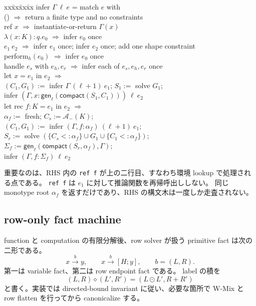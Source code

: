 \documentclass[uplatex,dvipdfmx,a4paper,10.5pt]{jsarticle}
\theoremstyle{jpplain}
\newcommand{\gen}{\mathsf{gen}}
\newcommand{\compact}{\mathsf{compact}}
\newcommand{\edge}[3]{#1\xrightarrow{#2}#3}
\newcommand{\epedge}[4]{#1\xrightarrow{#2}[#3;#4]}
\begin{document}
\begin{formalbox}[title={推論関数の制御構造}]
\begingroup\small\ttfamily
\begin{tabbing}
xx\=xx\=xx\=xx\kill
infer $\Gamma\ \ell\ e$ = match $e$ with\\
\> () $\Rightarrow$ return a finite type and no constraints\\
\> ref $x$ $\Rightarrow$ instantiate-or-return $\Gamma(x)$\\
\> $\lambda(x:K):q.e_0$ $\Rightarrow$ infer $e_0$ once\\
\> $e_1\ e_2$ $\Rightarrow$ infer $e_1$ once; infer $e_2$ once; add one shape constraint\\
\> perform$_h(e_0)$ $\Rightarrow$ infer $e_0$ once\\
\> handle $e_s$ with $e_h,e_r$ $\Rightarrow$ infer each of $e_s,e_h,e_r$ once\\
\> let $x=e_1$ in $e_2$ $\Rightarrow$\\
\>\> $(C_1,G_1):=$ infer $\Gamma\ (\ell+1)\ e_1$; $S_1:=$ solve $G_1$;\\
\>\> infer $(\Gamma,x:\gen_\ell(\compact(S_1,C_1)))\ \ell\ e_2$\\
\> let rec $f:K=e_1$ in $e_2$ $\Rightarrow$\\
\>\> $\alpha_f:=$ fresh; $C_s:=\mathcal A_-(K)$;\\
\>\> $(C_1,G_1):=$ infer $(\Gamma,f:\alpha_f)\ (\ell+1)\ e_1$;\\
\>\> $S_r:=$ solve $(\{C_s<:\alpha_f\}\cup G_1\cup\{C_1<:\alpha_f\})$;\\
\>\> $\Sigma_f:=\gen_\ell(\compact(S_r,\alpha_f),\Gamma)$;\\
\>\> infer $(\Gamma,f:\Sigma_f)\ \ell\ e_2$
\end{tabbing}
\endgroup
\end{formalbox}

重要なのは、RHS 内の \texttt{ref f} が上の二行目、すなわち環境 lookup で処理される点である。
\texttt{ref f} は $e_1$ に対して推論関数を再帰呼出ししない。
同じ monotype root $\alpha_f$ を返すだけであり、RHS の構文木は一度しか走査されない。

\subsection{row-only fact machine}

function と computation の有限分解後、row solver が扱う primitive fact は次の二形である。
\[
  \edge{x}{b}{y},
  \qquad
  \epedge{x}{b}{H}{y},
  \qquad b=(L,R).
\]
第一は variable fact、第二は row endpoint fact である。
label の積を
\[
 (L,R)\diamond(L',R')=(L\odot L',R+R')
\]
と書く。実装では directed-bound invariant に従い、必要な箇所で W-Mix と row flatten を行ってから canonicalize する。
\end{document}
